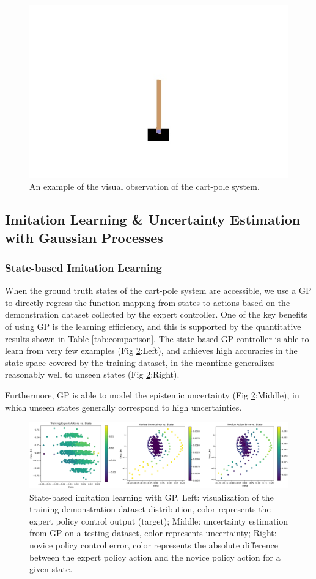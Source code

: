 \documentclass[11pt, reqno, letterpaper, twoside]{amsart}
\begin{document}
\begin{figure}[ht]
	\centering
	\includegraphics[width=0.5\linewidth]{imgs/random_rollout3.jpg}
	\caption{An example of the visual observation of the cart-pole system.}
	\label{fig:cart-pole}
\end{figure}

\subsection{Imitation Learning \& Uncertainty Estimation with Gaussian Processes}
\subsubsection{State-based Imitation Learning}
When the ground truth states of the cart-pole system are accessible, we use a GP to directly regress the function mapping from states to actions based on the demonstration dataset collected by the expert controller. One of the key benefits of using GP is the learning efficiency, and this is supported by the quantitative results shown in Table \ref{tab:comparison}. The state-based GP controller is able to learn from very few examples (Fig \ref{fig:state-il}:Left), and achieves high accuracies in the state space covered by the training dataset, in the meantime generalizes reasonably well to unseen states (Fig \ref{fig:state-il}:Right).

Furthermore, GP is able to model the epistemic uncertainty (Fig \ref{fig:state-il}:Middle), in which unseen states generally correspond to high uncertainties.

\begin{figure}[ht]
	\centering
	\includegraphics[width=\linewidth]{imgs/state-il.png}
	\caption{State-based imitation learning with GP. Left: visualization of the training demonstration dataset distribution, color represents the expert policy control output (target); Middle: uncertainty estimation from GP on a testing dataset, color represents uncertainty; Right: novice policy control error, color represents the absolute difference between the expert policy action and the novice policy action for a given state.}
	\label{fig:state-il}
\end{figure}
\end{document}
